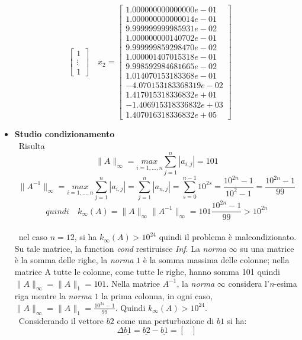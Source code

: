 \begin{itemize}
\[\begin{bmatrix}
  			1   \\
  			\vdots  \\
  			1
  		\end{bmatrix} \quad
  		x_2 = \begin{bmatrix}
  		    1.000000000000000e-01 \\
  			1.000000000000014e-01 \\
  			9.999999999985931e-02 \\
  			1.000000000140702e-01 \\
  			9.999999859298470e-02 \\
     		1.000001407015318e-01 \\
     		9.998592984681665e-02 \\
     		1.014070153183368e-01 \\
    		-4.070153183368319e-02 \\
    		1.417015318336832e+01 \\
    		-1.406915318336832e+03 \\
     		1.407016318336832e+05
  		\end{bmatrix}
  		\]
	\begin{itemize}
		\item \textbf{Studio condizionamento}\\\
			Risulta
				\[
					\|A\|_\infty = \underset{i=1,...,n}{max} \sum_{j=1}^n|a_{i,j}|=101
				\]
				\[
					\|A^{-1}\|_\infty = \underset{i=1,...,n}{max} \sum_{j=1}^n|a_{i,j}|=\sum_{j=1}^n|a_{n,j}|=\sum_{s=0}^{n-1}10^{2s}=\frac{10^{2n}-1}{10^2-1}=\frac{10^{2n}-1}{99}
				\]
				\[
					quindi 
					\quad
					k_\infty(A) = \|A\|_\infty \|A^{-1}\|_\infty=101\frac{10^{2n}-1}{99}>10^{2n}
				\]\\\
			nel caso $n=12$, si ha $k_\infty(A)>10^{24}$ quindi il problema è malcondizionato. Su tale matrice, la function \textit{cond} restiruisce \textit{Inf}.
			La \textit{norma} $\infty$ su una matrice è la somma delle righe, la \textit{norma} $1$ è la somma massima delle colonne; nella matrice A tutte le colonne, come tutte le righe, hanno somma 101 quindi $\|A\|_\infty=\|A\|_1=101$. Nella matrice $A^{-1}$, la \textit{norma} $\infty$ considera l'\textit{n}-esima riga mentre la \textit{norma} $1$ la prima colonna, in ogni caso, $\|A\|_\infty=\|A\|_1=\frac{10^{24}-1}{99}$. Quindi $k_\infty(A)>10^{24}$.\\\
			Considerando il vettore $\underline{b2}$ come una perturbazione di $\underline{b1}$ si ha:
			\[
				\Delta\underline{b1}=\underline{b2}-\underline{b1}=\begin{bmatrix}

\end{bmatrix}\]
\end{itemize}
\end{itemize}
